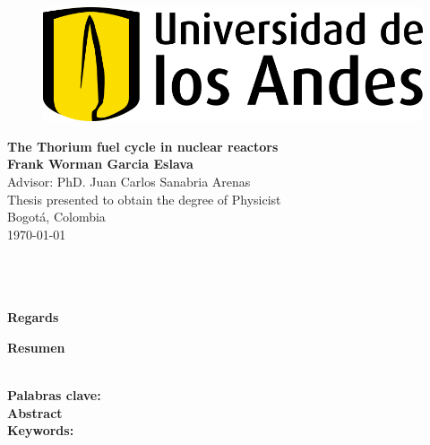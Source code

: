 
\begin{center}
\begin{figure}
    \centering%
    \includegraphics[scale=0.45]{HojaTitulo/Figures_HojaTitulo/Universidad_de_los_Andes_(logo).png} %
\end{figure}
\thispagestyle{empty} \vspace*{2.0cm} \textbf{\LARGE
The Thorium fuel cycle in nuclear reactors}\\[2.5cm]

\Large\textbf{Frank Worman Garcia Eslava}\\[2.0cm]

Advisor: PhD. Juan Carlos Sanabria Arenas \\[2.0cm]


\Large Thesis presented to obtain the degree of Physicist \\ [2.0cm]


Bogot\'{a}, Colombia\\ [0.5cm]
\today \\
\end{center}

\newpage{\pagestyle{empty}\cleardoublepage}

\newpage
\thispagestyle{empty} \textbf{}\normalsize
\\\\\\%
\textbf{\LARGE Regards}\\



\newpage{\pagestyle{empty}\cleardoublepage}

\textbf{\LARGE Resumen}
\\


\textbf{\small Palabras clave: }\\


\newpage
\textbf{\LARGE Abstract}\\


\textbf{\small Keywords:}\\